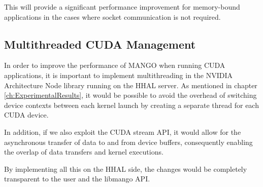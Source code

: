This will provide a significant performance improvement for memory-bound applications in the cases where socket communication is not required.

\subsection{Multithreaded CUDA Management}

In order to improve the performance of MANGO when running CUDA applications, it is important to implement multithreading in the NVIDIA Architecture Node library running on the HHAL server. As mentioned in chapter \ref{ch:ExperimentalResults}, it would be possible to avoid the overhead of switching device contexts between each kernel launch by creating a separate thread for each CUDA device. 

In addition, if we also exploit the CUDA stream API, it would allow for the asynchronous transfer of data to and from device buffers, consequently enabling the overlap of data transfers and kernel executions. 

By implementing all this on the HHAL side, the changes would be completely transparent to the user and the libmango API.
